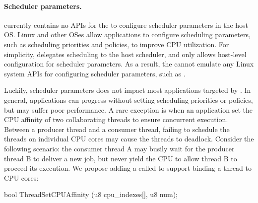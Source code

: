 \paragraph{Scheduler parameters.}
\Thehostabi{} currently contains no APIs for the \libos{} to configure scheduler parameters in the host OS.
Linux and other OSes allow applications to configure scheduling parameters,
such as scheduling priorities and policies,
to improve CPU utilization.
For simplicity,
\thehostabi{} delegates scheduling to the host scheduler,
and only allows host-level configuration for scheduler parameters.
As a result, the \libos{} cannot emulate any Linux system APIs for configuring scheduler parameters,
such as .



Luckily, scheduler parameters does not impact most applications targeted by \graphene{}.
In general, applications can progress without setting scheduling priorities or policies, but may suffer poor performance.
A rare exception is when
an application set the CPU affinity of two collaborating threads to ensure concurrent execution.
Between a producer thread and a consumer thread,
failing to schedule the threads on individual CPU cores may cause the threads to deadlock.
Consider the following scenario:
the consumer thread A may busily wait for the producer thread B to deliver a new job, but never yield the CPU to allow thread B to proceed its execution.
We propose adding a \hostapi{} called 
to support binding a thread to CPU cores:

\begin{paldef}
bool ThreadSetCPUAffinity (u8 cpu_indexes[], u8 num);
\end{paldef}

